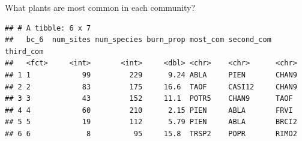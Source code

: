 \documentclass[
  ignorenonframetext,
]{beamer}
\newenvironment{Shaded}{\begin{snugshade}}{\end{snugshade}}
\newcommand{\DataTypeTok}[1]{\textcolor[rgb]{0.13,0.29,0.53}{#1}}
\newcommand{\DecValTok}[1]{\textcolor[rgb]{0.00,0.00,0.81}{#1}}
\newcommand{\KeywordTok}[1]{\textcolor[rgb]{0.13,0.29,0.53}{\textbf{#1}}}
\newcommand{\NormalTok}[1]{#1}
\newcommand{\OperatorTok}[1]{\textcolor[rgb]{0.81,0.36,0.00}{\textbf{#1}}}
\newcommand{\StringTok}[1]{\textcolor[rgb]{0.31,0.60,0.02}{#1}}
\begin{document}
\begin{frame}[fragile]{What plants are most common in each community?}
\protect\hypertarget{what-plants-are-most-common-in-each-community}{}

\scriptsize

\begin{Shaded}
\end{Shaded}

\begin{verbatim}
## # A tibble: 6 x 7
##   bc_6  num_sites num_species burn_prop most_com second_com third_com
##   <fct>     <int>       <int>     <dbl> <chr>    <chr>      <chr>    
## 1 1            99         229      9.24 ABLA     PIEN       CHAN9    
## 2 2            83         175     16.6  TAOF     CASI12     CHAN9    
## 3 3            43         152     11.1  POTR5    CHAN9      TAOF     
## 4 4            60         210      2.15 PIEN     ABLA       FRVI     
## 5 5            19         112      5.79 PIEN     ABLA       BRCI2    
## 6 6             8          95     15.8  TRSP2    POPR       RIMO2
\end{verbatim}

\end{frame}
\end{document}
